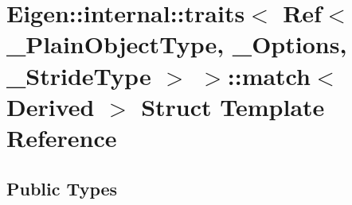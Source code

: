 \hypertarget{struct_eigen_1_1internal_1_1traits_3_01_ref_3_01___plain_object_type_00_01___options_00_01___stride_type_01_4_01_4_1_1match}{}\section{Eigen\+::internal\+::traits$<$ Ref$<$ \+\_\+\+Plain\+Object\+Type, \+\_\+\+Options, \+\_\+\+Stride\+Type $>$ $>$\+::match$<$ Derived $>$ Struct Template Reference}
\label{struct_eigen_1_1internal_1_1traits_3_01_ref_3_01___plain_object_type_00_01___options_00_01___stride_type_01_4_01_4_1_1match}
\subsection*{Public Types}
